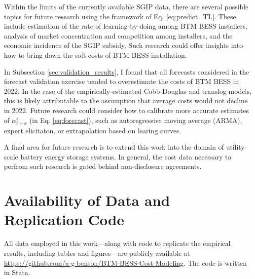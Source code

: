 \documentclass[preprint,12pt,authoryear]{elsarticle}
\begin{document}
Within the limits of the currently available SGIP data, there are several possible topics for future research using the framework of Eq. \ref{eq:predict_TL}. These include estimation of the rate of learning-by-doing among BTM BESS installers, analysis of market concentration and competition among installers, and the economic incidence of the SGIP subsidy. Such research could offer insights into how to bring down the soft costs of BTM BESS installation.

In Subsection \ref{sec:validation_results}, I found that all forecasts considered in the forecast validation exercise tended to overestimate the costs of BTM BESS in 2022. In the case of the empirically-estimated Cobb-Douglas and translog models, this is likely attributable to the assumption that average costs would not decline in 2022. Future research could consider how to calibrate more accurate estimates of  $\alpha^{s}_{t+x}$ (in Eq. \ref{eq:forecast}), such as autoregressive moving average (ARMA), expert elicitaton, or extrapolation based on learing curves. 

A final area for future research is to extend this work into the domain of utility-scale battery energy storage systems. In general, the cost data necessary to perfrom such research is gated behind non-disclosure agreements.

\section{Availability of Data and Replication Code}\label{sec:data_avail}

All data employed in this work---along with code to replicate the empirical results, including tables and figures---are publicly available at \url{https://github.com/a-g-benson/BTM-BESS-Cost-Modeling}. The code is written in Stata.



 


\appendix 




\newpage






\end{document}
